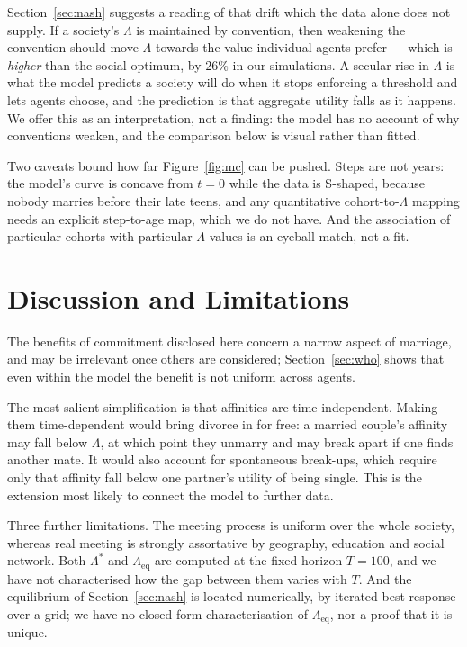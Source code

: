 \documentclass[sigconf,anonymous]{aamas}
\newcommand{\Leq}{\Lambda_{\mathrm{eq}}}
\newcommand{\Lopt}{\Lambda^\ast}
\begin{document}
Section~\ref{sec:nash} suggests a reading of that drift which the data alone
does not supply. If a society's $\Lambda$ is maintained by convention, then
weakening the convention should move $\Lambda$ towards the value individual
agents prefer --- which is \emph{higher} than the social optimum, by $26\%$ in
our simulations. A secular rise in $\Lambda$ is what the model predicts a
society will do when it stops enforcing a threshold and lets agents choose,
and the prediction is that aggregate utility falls as it happens. We offer this
as an interpretation, not a finding: the model has no account of why conventions
weaken, and the comparison below is visual rather than fitted.

Two caveats bound how far Figure~\ref{fig:mc} can be pushed. Steps are not
years: the model's curve is concave from $t = 0$ while the data is S-shaped,
because nobody marries before their late teens, and any quantitative
cohort-to-$\Lambda$ mapping needs an explicit step-to-age map, which we do not
have. And the association of particular cohorts with particular $\Lambda$ values
is an eyeball match, not a fit.


\section{Discussion and Limitations}
\label{sec:limitations}

\balance

The benefits of commitment disclosed here concern a narrow aspect of marriage,
and may be irrelevant once others are considered; Section~\ref{sec:who} shows
that even within the model the benefit is not uniform across agents.

The most salient simplification is that affinities are time-independent. Making
them time-dependent would bring divorce in for free: a married couple's affinity
may fall below $\Lambda$, at which point they unmarry and may break apart if one
finds another mate. It would also account for spontaneous break-ups, which
require only that affinity fall below one partner's utility of being single.
This is the extension most likely to connect the model to further data.

Three further limitations. The meeting process is uniform over the whole
society, whereas real meeting is strongly assortative by geography, education
and social network. Both $\Lopt$ and $\Leq$ are computed at the fixed horizon
$T = 100$, and we have not characterised how the gap between them varies with
$T$. And the equilibrium of Section~\ref{sec:nash} is located numerically, by
iterated best response over a grid; we have no closed-form characterisation of
$\Leq$, nor a proof that it is unique.
\end{document}
